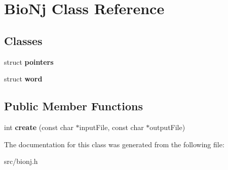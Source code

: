 \hypertarget{classBioNj}{
\section{BioNj Class Reference}
\label{classBioNj}
}
\subsection*{Classes}
\begin{DoxyCompactItemize}
\item 
struct {\bfseries pointers}
\item 
struct {\bfseries word}
\end{DoxyCompactItemize}
\subsection*{Public Member Functions}
\begin{DoxyCompactItemize}
\item 
\hypertarget{classBioNj_a214993a9925f4695e16be1981e913cf4}{
int {\bfseries create} (const char $\ast$inputFile, const char $\ast$outputFile)}
\label{classBioNj_a214993a9925f4695e16be1981e913cf4}

\end{DoxyCompactItemize}


The documentation for this class was generated from the following file:\begin{DoxyCompactItemize}
\item 
src/bionj.h\end{DoxyCompactItemize}
